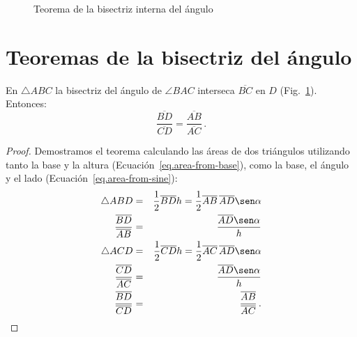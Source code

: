 \begin{figure}[b]
\begin{center}
\end{center}
\caption{Teorema de la bisectriz interna del ángulo}\label{f.angle-bisector}
\end{figure}

\section{Teoremas de la bisectriz del ángulo}\label{a.bisector}

\begin{theorem}\label{thm.angle-bisector}
En $\triangle ABC$ la bisectriz del ángulo de $\angle BAC$ interseca $\overline{BC}$ en $D$ (Fig.~\ref{f.angle-bisector}). Entonces:
\[
\frac {\overline{BD}}{\overline{CD}}=\frac {\overline{AB}}{\overline{AC}}\,.
\]
\end{theorem}
\begin{proof}
Demostramos el teorema calculando las áreas de dos triángulos utilizando tanto la base y la altura (Ecuación~\ref{eq.area-from-base}), como la base, el ángulo y el lado (Ecuación~\ref{eq.area-from-sine}):
\begin{eqnarray*}
\triangle ABD&=&\frac{1}{2}\overline{BD}h=\frac{1}{2}\overline{AB}\,\overline{AD}\sen \alpha\\
\frac{\overline{BD}}{\overline{AB}}&=&\frac{\overline{AD}\sen \alpha}{h}\\
\triangle ACD&=&\frac{1}{2}\overline{CD}h=\frac{1}{2}\overline{AC}\,\overline{AD}\sen \alpha\\
\frac{\overline{CD}}{\overline{AC}}&=&\frac{\overline{AD}\sen \alpha}{h}\\
\frac{\overline{BD}}{\overline{CD}}&=&\frac{\overline{AB}}{\overline{AC}}\,.
\end{eqnarray*}%
\end{proof}

